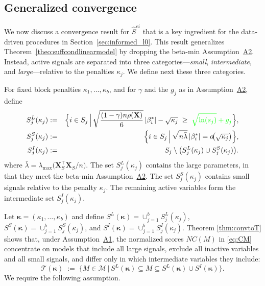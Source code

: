 \documentclass[
  12pt]{article}
\newcommand{\M}{\mathcal{M}}
\newcommand{\T}{\mathcal{T}}
\newcommand{\bX}{\mathbf{X}}
\newcommand{\bkappa}{\boldsymbol{\kappa}}
\begin{document}
\subsection{Generalized convergence}\label{ssec:nobetaminhyp}

We now discuss a convergence result for $\hat S^{ei}$ that is a key ingredient for the data-driven procedures in Section~\ref{sec:informed_l0}. This result generalizes Theorem~\ref{theo:suffcondlinearmodel} by dropping the beta-min Assumption~\hyperlink{lab:A2}{A2}. Instead, active signals are separated into three categories---\emph{small}, \emph{intermediate}, and \emph{large}---relative to the penalties $\kappa_j$. We define next these three categories.

For fixed block penalties $\kappa_1,\ldots,\kappa_b$, and for $\gamma$ \color{green} and the $g_j$ \color{black} as in Assumption~\hyperlink{lab:A2}{A2}, define
\begin{eqnarray}\label{eq:defSes}
    S_j^{L}(\kappa_j)
    &:=&
    \Big\{ i \in S_j \,\Big|\, \sqrt{\frac{(1-\gamma) n\rho(\bX)}{6}}\,|\beta_i^*|-\sqrt{\kappa_j}
    \;\geq\;\color{green}\sqrt{\ln(s_j)} + g_j\color{black}\Big\},\label{eq:defslsi}\\
    S_j^{S}(\kappa_j)
    &:=&
    \Big\{ i \in S_j \,\Big|\, \sqrt{n\bar{\lambda}}\,|\beta_i^*|=o\!\big(\sqrt{\kappa_j}\big) \Big\},\nonumber\\
    S_j^{I}(\kappa_j)
    &:=&
    S_j \setminus \big(S_j^{L}(\kappa_j) \cup S_j^{S}(\kappa_j)\big).\nonumber
\end{eqnarray}
where $\bar{\lambda}=\lambda_{\max}\Big(\bX_{S}^\top\bX_{S}/n\Big)$.
The set $S_j^{L}(\kappa_j)$ contains the large parameters, in that they meet the beta-min Assumption~\hyperlink{lab:A2}{A2}. The set $S_j^{S}(\kappa_j)$ contains small signals relative to the penalty $\kappa_j$. The remaining active variables form the intermediate set $S_j^{I}(\kappa_j)$.

Let $\bkappa=(\kappa_1,\ldots,\kappa_b)$ and define
$S^{L}(\bkappa)=\cup_{j=1}^b S_j^{L}(\kappa_j)$,
$S^{S}(\bkappa)=\cup_{j=1}^b S_j^{S}(\kappa_j)$, and
$S^{I}(\bkappa)=\cup_{j=1}^b S_j^{I}(\kappa_j)$.
Theorem \ref{thm:convtoT} shows that, under Assumption~\hyperlink{lab:A1}{A1}, the normalized scores $NC(M)$ in \eqref{eq:CM} concentrate on models that include all large signals, exclude all inactive variables and all small signals, and differ only in which intermediate variables they include: %
\begin{equation} \label{eq:Tkappa}
\T(\bkappa)
\;:=\;
\Big\{M \in \M \,\Big|\,
S^{L}(\bkappa)\subseteq M \subseteq S^{L}(\bkappa)\cup S^{I}(\bkappa)
\Big\}.
\end{equation}
We require the following assumption.
\end{document}

